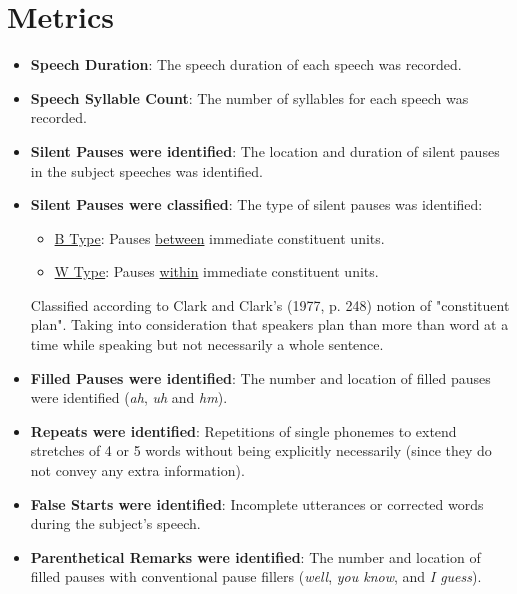 \documentclass{Paper_Summary}
\begin{document}
\section{Metrics}
    \begin{itemize}
        \item \textbf{Speech Duration}: The speech duration of each speech was recorded.
        \item \textbf{Speech Syllable Count}: The number of syllables for each speech was recorded.
        \item \textbf{Silent Pauses were identified}: The location and duration of silent pauses in the subject speeches was identified.
        \item \textbf{Silent Pauses were classified}: The type of silent pauses was identified:
        \begin{itemize}
            \item \underline{B Type}: Pauses \underline{between} immediate constituent units.
            \item \underline{W Type}: Pauses \underline{within} immediate constituent units.
        \end{itemize}
        Classified according to Clark and Clark's (1977, p. 248) notion of "constituent plan". Taking into consideration that speakers plan than more than word at a time while speaking but not necessarily a whole sentence.
        \item \textbf{Filled Pauses were identified}: The number and location of filled pauses were identified (\emph{ah}, \emph{uh} and \emph{hm}).
        \item \textbf{Repeats were identified}: Repetitions of single phonemes to extend stretches of 4 or 5 words without being explicitly necessarily (since they do not convey any extra information).
        \item \textbf{False Starts were identified}: Incomplete utterances or corrected words during the subject's speech.
        \item \textbf{Parenthetical Remarks were identified}: The number and location of filled pauses with conventional pause fillers (\emph{well}, \emph{you know}, and \emph{I guess}). 
    \end{itemize}
\end{document}
